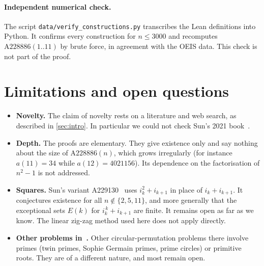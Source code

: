 \documentclass[11pt]{article}
\numberwithin{equation}{section}
\theoremstyle{definition}
\theoremstyle{remark}
\begin{document}
\paragraph{Independent numerical check.}
The script \texttt{data/verify\_constructions.py} transcribes the Lean definitions into Python. It
confirms every construction for $n\le 3000$ and recomputes $\mathrm{A228886}(1..11)$ by brute force, in
agreement with the OEIS data. This check is not part of the proof.

\section{Limitations and open questions}\label{sec:limits}

\begin{itemize}
\item \textbf{Novelty.} The claim of novelty rests on a literature and web search, as described in
\cref{sec:intro}. In particular we could not check Sun's 2021 book~\cite{SunBook}.
\item \textbf{Depth.} The proofs are elementary. They give existence only and say nothing about the
size of $\mathrm{A228886}(n)$, which grows irregularly (for instance $a(11)=34$ while
$a(12)=4021156$). Its dependence on the factorisation of $n^2-1$ is not addressed.
\item \textbf{Squares.} Sun's variant A229130~\cite{A229130} uses $i_k^2+i_{k+1}$ in place of
$i_k+i_{k+1}$. It conjectures existence for all $n\notin\{2,5,11\}$, and more generally that the
exceptional sets $E(k)$ for $i_k^{\,k}+i_{k+1}$ are finite. It remains open as far as we know.
The linear zig-zag method used here does not apply directly.
\item \textbf{Other problems in~\cite{Sun1309}.} Other circular-permutation problems there involve
primes (twin primes, Sophie Germain primes, prime circles) or primitive roots. They are of a
different nature, and most remain open.
\end{itemize}
\end{document}
